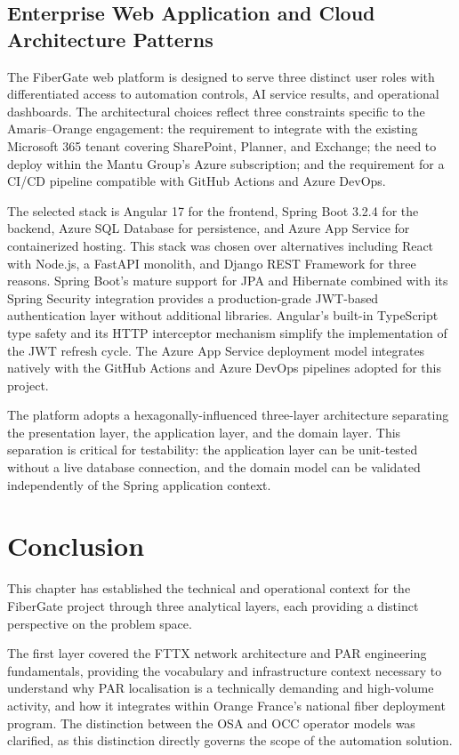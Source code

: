\subsection{Enterprise Web Application and Cloud Architecture Patterns}

The FiberGate web platform is designed to serve three distinct user roles with differentiated access to automation controls, AI service results, and operational dashboards. The architectural choices reflect three constraints specific to the Amaris--Orange engagement: the requirement to integrate with the existing Microsoft 365 tenant covering SharePoint, Planner, and Exchange; the need to deploy within the Mantu Group's Azure subscription; and the requirement for a CI/CD pipeline compatible with GitHub Actions and Azure DevOps.

The selected stack is Angular 17 for the frontend, Spring Boot 3.2.4 for the backend, Azure SQL Database for persistence, and Azure App Service for containerized hosting. This stack was chosen over alternatives including React with Node.js, a FastAPI monolith, and Django REST Framework for three reasons. Spring Boot's mature support for JPA and Hibernate combined with its Spring Security integration provides a production-grade JWT-based authentication layer without additional libraries. Angular's built-in TypeScript type safety and its HTTP interceptor mechanism simplify the implementation of the JWT refresh cycle. The Azure App Service deployment model integrates natively with the GitHub Actions and Azure DevOps pipelines adopted for this project.

The platform adopts a hexagonally-influenced three-layer architecture separating the presentation layer, the application layer, and the domain layer. This separation is critical for testability: the application layer can be unit-tested without a live database connection, and the domain model can be validated independently of the Spring application context.

\section*{Conclusion}

This chapter has established the technical and operational context for the FiberGate project through three analytical layers, each providing a distinct perspective on the problem space.

The first layer covered the FTTX network architecture and PAR engineering fundamentals, providing the vocabulary and infrastructure context necessary to understand why PAR localisation is a technically demanding and high-volume activity, and how it integrates within Orange France's national fiber deployment program. The distinction between the OSA and OCC operator models was clarified, as this distinction directly governs the scope of the automation solution.

